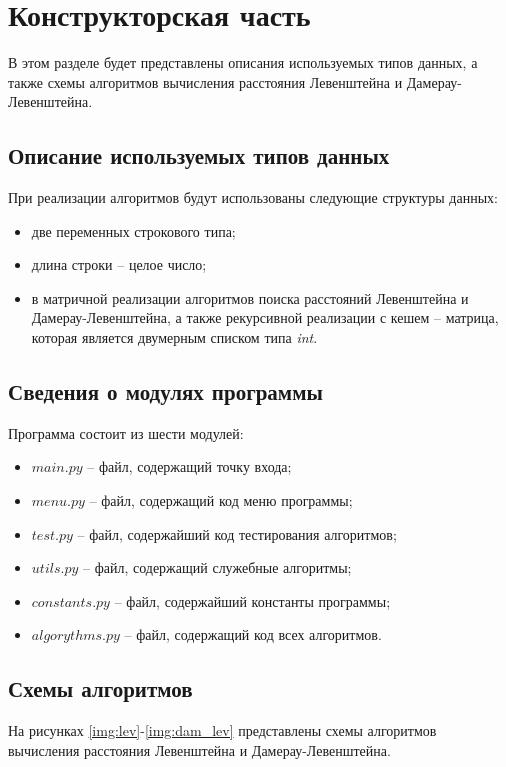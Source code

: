\chapter{Конструкторская часть}
В этом разделе будет представлены описания используемых типов данных, а также схемы алгоритмов вычисления расстояния Левенштейна и Дамерау-Левенштейна.

\section{Описание используемых типов данных}
При реализации алгоритмов будут использованы следующие структуры данных:

\begin{itemize}
    \item две переменных строкового типа;
    \item длина строки -- целое число;
    \item в матричной реализации алгоритмов поиска расстояний Левенштейна и Дамерау-Левенштейна, а также рекурсивной реализации с кешем -- матрица, которая является двумерным списком типа \textit{int}.
\end{itemize}


\section{Сведения о модулях программы}
Программа состоит из шести модулей:
\begin{itemize}
	\item $main.py$ -- файл, содержащий точку входа;
    \item $menu.py$ -- файл, содержащий код меню программы;
    \item $test.py$ -- файл, содержайший код тестирования алгоритмов;
    \item $utils.py$ -- файл, содержащий служебные алгоритмы;
    \item $constants.py$ -- файл, содержайший константы программы;
    \item $algorythms.py$ -- файл, содержащий код всех алгоритмов. \newline
\end{itemize}


\section{Схемы алгоритмов}
На рисунках \ref{img:lev}-\ref{img:dam_lev} представлены схемы алгоритмов вычисления расстояния Левенштейна и Дамерау-Левенштейна.

